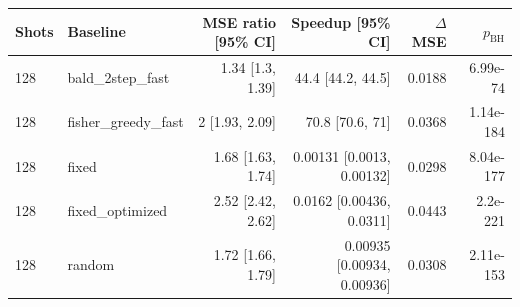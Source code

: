 \begin{tabular}{llrrrr}
\toprule
Shots & Baseline & MSE ratio [95\% CI] & Speedup [95\% CI] & $\Delta$MSE & $p_{\mathrm{BH}}$ \\
\midrule
128 & bald\_2step\_fast & 1.34 [1.3, 1.39] & 44.4 [44.2, 44.5] & 0.0188 & 6.99e-74 \\
128 & fisher\_greedy\_fast & 2 [1.93, 2.09] & 70.8 [70.6, 71] & 0.0368 & 1.14e-184 \\
128 & fixed & 1.68 [1.63, 1.74] & 0.00131 [0.0013, 0.00132] & 0.0298 & 8.04e-177 \\
128 & fixed\_optimized & 2.52 [2.42, 2.62] & 0.0162 [0.00436, 0.0311] & 0.0443 & 2.2e-221 \\
128 & random & 1.72 [1.66, 1.79] & 0.00935 [0.00934, 0.00936] & 0.0308 & 2.11e-153 \\
\bottomrule
\end{tabular}

